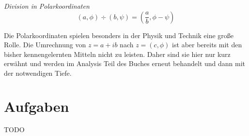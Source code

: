 \begin{definition} \textsl{Division in Polarkoordinaten}
\[
(a,\phi) \div (b,\psi) = \left(\frac{a}{b}, \phi-\psi\right)
\]
\end{definition}

Die Polarkoordinaten spielen besonders in der Physik und Technik eine große Rolle. Die Umrechnung von $z=a+ib$ nach $z=(c,\phi)$ ist aber bereits mit den bisher kennengelernten Mitteln nicht zu leisten. Daher sind sie hier nur kurz erwähnt und werden im Analysis Teil des Buches erneut behandelt und dann mit der notwendigen Tiefe. 


\section{Aufgaben}
TODO
